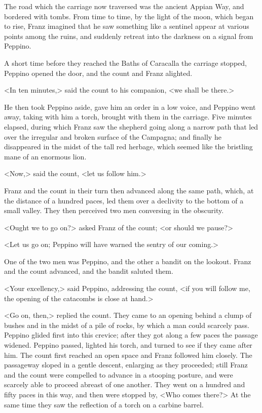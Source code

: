  The road which the carriage now traversed was the ancient Appian Way, and bordered with tombs. From time to time, by the light of the moon, which began to rise, Franz imagined that he saw something like a sentinel appear at various points among the ruins, and suddenly retreat into the darkness on a signal from Peppino. 

 A short time before they reached the Baths of Caracalla the carriage stopped, Peppino opened the door, and the count and Franz alighted. 

 <In ten minutes,> said the count to his companion, <we shall be there.> 

 He then took Peppino aside, gave him an order in a low voice, and Peppino went away, taking with him a torch, brought with them in the carriage. Five minutes elapsed, during which Franz saw the shepherd going along a narrow path that led over the irregular and broken surface of the Campagna; and finally he disappeared in the midst of the tall red herbage, which seemed like the bristling mane of an enormous lion. 

 <Now,> said the count, <let us follow him.> 

 Franz and the count in their turn then advanced along the same path, which, at the distance of a hundred paces, led them over a declivity to the bottom of a small valley. They then perceived two men conversing in the obscurity. 

 <Ought we to go on?> asked Franz of the count; <or should we pause?> 

 <Let us go on; Peppino will have warned the sentry of our coming.> 

 One of the two men was Peppino, and the other a bandit on the lookout. Franz and the count advanced, and the bandit saluted them. 

 <Your excellency,> said Peppino, addressing the count, <if you will follow me, the opening of the catacombs is close at hand.> 

 <Go on, then,> replied the count. They came to an opening behind a clump of bushes and in the midst of a pile of rocks, by which a man could scarcely pass. Peppino glided first into this crevice; after they got along a few paces the passage widened. Peppino passed, lighted his torch, and turned to see if they came after him. The count first reached an open space and Franz followed him closely. The passageway sloped in a gentle descent, enlarging as they proceeded; still Franz and the count were compelled to advance in a stooping posture, and were scarcely able to proceed abreast of one another. They went on a hundred and fifty paces in this way, and then were stopped by, <Who comes there?> At the same time they saw the reflection of a torch on a carbine barrel. 

